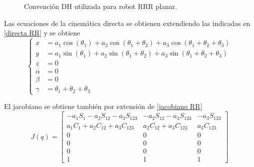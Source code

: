 \documentclass[a4paper,12pt]{article}
\begin{document}
\begin{figure}[H]
    \centering
    \begin{adjustbox}{scale = 0.55, max width=\columnwidth}
    \end{adjustbox}
    \caption{Convención DH utilizada para robot RRR planar.}
\end{figure}

Las ecuaciones de la cinemática directa se obtienen extendiendo las indicadas en \cref{directa RR} y se obtiene
\begin{equation*}
    \left\{
    \begin{aligned}
    x &= a_1 \cos(\theta_1) + a_2 \cos(\theta_1 + \theta_2) + a_3 \cos(\theta_1 + \theta_2 + \theta_3)\\
    y &= a_1 \sin(\theta_1) + a_2 \sin(\theta_1 + \theta_2) + a_3 \sin(\theta_1 + \theta_2 + \theta_3)\\
    z &= 0 \\
    \alpha &= 0 \\
    \beta &= 0 \\
    \gamma &= \theta_1 + \theta_2 + \theta_3
    \end{aligned}
    \right.
    \label{directa RRR}
\end{equation*}

El jacobiano se obtiene también por extensión de \cref{jacobiano RR}
\begin{equation}
    J(q) = 
    \begin{bmatrix}
        -a_1S_1 - a_2S_{12} - a_3S_{123}& -a_2S_{12} - a_3S_{123} & - a_3S_{123}\\
        a_1C_1 + a_2C_{12} + a_3C_{123}& a_2C_{12} + a_3C_{123}  &  a_3C_{123}\\
        0                               & 0                       & 0\\
        0                               & 0                       & 0\\
        0                               & 0                       & 0\\
        1                               & 1                       & 1
    \end{bmatrix}
    \label{jacobiano RRR}
\end{equation}
\end{document}
